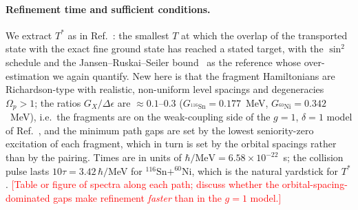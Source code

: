 \documentclass[
  aps,
  prc,
  reprint,
  superscriptaddress,
  floatfix,
  nofootinbib
]{revtex4-2}
\newcommand{\todo}[1]{\textcolor{red}{[#1]}}
\newcommand{\Sn}{^{116}\mathrm{Sn}}
\newcommand{\Ni}{^{60}\mathrm{Ni}}
\begin{document}
\paragraph{Refinement time and sufficient conditions.}
We extract $T^*$ as in Ref.~\cite{EigenQPairing2026}: the smallest $T$ at
which the overlap of the transported state with the exact fine ground state
has reached a stated target, with the $\sin^2$ schedule and the
Jansen--Ruskai--Seiler bound~\cite{Jansen2007} as the reference whose
over-estimation we again quantify.  New here is that the fragment
Hamiltonians are Richardson-type with realistic, non-uniform level spacings
and degeneracies $\Omega_p>1$; the ratios $G_X/\Delta\epsilon$ are
$\approx0.1$--$0.3$ ($G_{\Sn}=0.177$~MeV, $G_{\Ni}=0.342$~MeV), i.e.\ the
fragments are on the weak-coupling side of the $g=1$, $\delta=1$ model of
Ref.~\cite{EigenQPairing2026}, and the minimum path gaps are set by the
lowest seniority-zero excitation of each fragment, which in turn is set
by the orbital spacings rather than by the pairing.  Times are in units of
$\hbar/\mathrm{MeV}=6.58\times10^{-22}$~s; the collision pulse lasts
$10\tau=3.42\,\hbar/$MeV for $\Sn+\Ni$, which is the natural yardstick
for $T^*$.  \todo{Table or figure of spectra along each path; discuss
whether the orbital-spacing-dominated gaps make refinement \emph{faster}
than in the $g=1$ model.}

\end{document}
